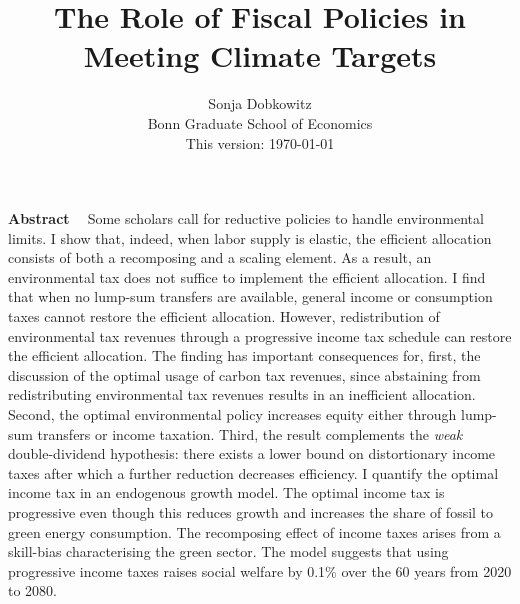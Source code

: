 \documentclass[12pt]{article}
\title{The Role of Fiscal Policies in Meeting Climate Targets}
\date{Sonja Dobkowitz\\ Bonn Graduate School of Economics\\ %
\vspace{1mm}
This version: \today }
\renewenvironment{abstract}
{\small
	\list{}{
		\setlength{\leftmargin}{0.025\textwidth}%
		\setlength{\rightmargin}{\leftmargin}%
	}%
	\item\relax}
{\endlist}
\begin{document}
%	
	\maketitle
	\begin{abstract}
		\begin{singlespacing}
			\textbf{Abstract \ }
			Some scholars call for reductive policies to handle environmental limits. I show that, indeed, when labor supply is elastic, 
			the efficient allocation consists of both a recomposing and a scaling element. As a result, an environmental tax does not suffice to implement the efficient allocation. I find that when no lump-sum transfers are available, general income or consumption taxes cannot restore the efficient allocation. However, redistribution of environmental tax revenues through a progressive income tax schedule can restore the efficient allocation.
			The finding has important consequences for, first, the discussion of the optimal usage of carbon tax revenues, since abstaining from redistributing environmental tax revenues results in an inefficient allocation. Second, the optimal environmental policy increases equity either through lump-sum transfers or income taxation. Third, the result complements the \textit{weak} double-dividend hypothesis: there exists a lower bound on distortionary income taxes after which a further reduction decreases efficiency.
			I quantify the optimal income tax in an endogenous growth model. The optimal income tax is progressive even though this reduces growth and increases the share of fossil to green energy consumption. The recomposing effect of income taxes arises from a skill-bias characterising the green sector. 
			The model suggests that using progressive income taxes raises social welfare by 0.1\% over the 60 years from 2020 to 2080.
			

\end{singlespacing}
\end{abstract}
\end{document}
